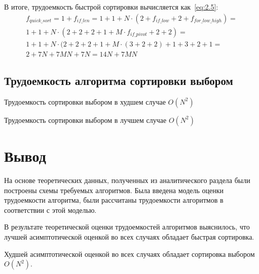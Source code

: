 В итоге, трудоемкость быстрой сортировки вычисляется как~\ref{eq:2.5}:
\begin{multline}
\label{eq:2.5}
f_{quick\_sort} = 1 + f_{if\_len} = 1 + 1 + N \cdot (2 + f_{if\_low} + 2 + f_{for\_low\_high}) = \\
1 + 1 + N \cdot (2 + 2 + 2 + 1 + M \cdot f_{if\_pivot} + 2 + 2) = \\
1 + 1 + N \cdot (2 + 2 + 2 + 1 + M \cdot (3 + 2 + 2) + 1 + 3 + 2 + 1 = \\
2 + 7N + 7MN +7N = 14N + 7MN 
\end{multline}

\subsection{Трудоемкость алгоритма сортировки выбором}

Трудоемкость сортировки выбором в худшем случае $O(N^2)$

Трудоемкость сортировки выбором в лучшем случае $O(N^2)$


\section*{Вывод}
На основе теоретических данных, полученных из аналитического раздела были построены схемы требуемых алгоритмов. 
Была введена модель оценки трудоемкости алгоритма, были рассчитаны трудоемкости алгоритмов в соответствии с этой моделью.

В результате теоретической оценки трудоемкостей алгоритмов выяснилось, что лучшей асимптотической оценкой во всех случаях обладает быстрая сортировка.

Худшей асимптотической оценкой во всех случаях обладает сортировка выбором $O(N^2)$.